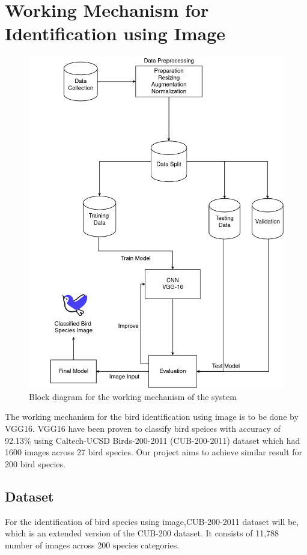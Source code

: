 \newpage

\section{Working Mechanism for Identification using Image}
\begin{figure}[h!]
    \centering
    \includegraphics[scale=0.33]{images/Methodology2.png}
    \caption{Block diagram for the working mechanism of the system}%
\end{figure}
The working mechanism for the bird identification using image is to be done by VGG16. VGG16 have been proven 
to classify bird speices with accuracy of 92.13\% using Caltech-UCSD Birds-200-2011 (CUB-200-2011) dataset 
which had 1600 images across 27 bird species\cite{islam2019bird}. Our project aims to achieve similar result for 200 bird species.

\subsection{Dataset}
For the identification of bird species using image,CUB-200-2011
dataset will be, which is an extended version of the CUB-200 dataset. It consists of
11,788 number of images across 200 species categories\cite{WahCUB_200_2011}.

